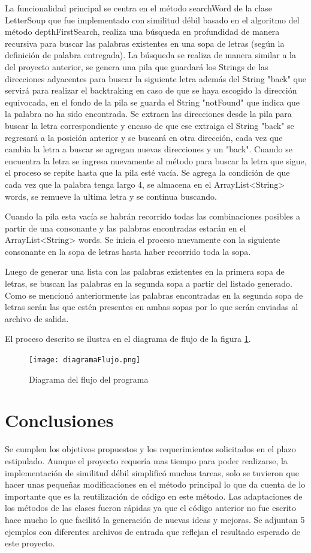 \documentclass[letterpaper,12pt]{report}
\begin{document}
La funcionalidad principal se centra en el método searchWord de la clase LetterSoup que fue implementado con similitud débil basado en el algoritmo del método depthFirstSearch, realiza una búsqueda en profundidad de manera recursiva para buscar las palabras existentes en una sopa de letras (según la definición de palabra entregada). La búsqueda se realiza de manera similar a la del proyecto anterior, se genera una pila que guardará los Strings de las direcciones adyacentes para buscar la siguiente letra además del String "back" que servirá para realizar el backtraking en caso de que se haya escogido la dirección equivocada, en el fondo de la pila se guarda el String "notFound" que indica que la palabra no ha sido encontrada. Se extraen las direcciones desde la pila para buscar la letra correspondiente y encaso de que ese extraiga el String "back" se regresará a la posición anterior y se buscará en otra dirección, cada vez que cambia la letra a buscar se agregan nuevas direcciones y un "back". Cuando se encuentra la letra se ingresa nuevamente al método para buscar la letra que sigue, el  proceso se repite hasta que la pila esté vacía. Se agrega la condición de que cada vez que la palabra tenga largo 4, se almacena en el ArrayList<String> words, se remueve la ultima letra y se continua buscando.

Cuando la pila esta vacía se habrán recorrido todas las combinaciones posibles a partir de una consonante y las palabras encontradas estarán en el ArrayList<String> words. Se inicia el proceso nuevamente con la siguiente consonante en la sopa de letras hasta haber recorrido toda la sopa.

Luego de generar una lista con las palabras existentes en la primera sopa de letras, se buscan las palabras en la segunda sopa a partir del listado generado. Como se mencionó anteriormente las palabras encontradas en la segunda sopa de letras serán las que estén presentes en ambas sopas por lo que serán enviadas al archivo de salida.

El proceso descrito se ilustra en el diagrama de flujo de la figura \ref{fig:diagramaFlujo}.

\begin{figure}[p]
    \centering
    \texttt{[image: diagramaFlujo.png]}
    \caption{Diagrama del flujo del programa}
    \label{fig:diagramaFlujo}
\end{figure}

\chapter{Conclusiones}

Se cumplen los objetivos propuestos y los requerimientos solicitados en el plazo estipulado. Aunque el proyecto requería mas tiempo para poder realizarse, la implementación de similitud débil simplificó muchas tareas, solo se tuvieron que hacer unas pequeñas modificaciones en el método principal lo que da cuenta de lo importante que es la reutilización de código en este método. Las adaptaciones de los métodos de las clases fueron rápidas ya que el código anterior no fue escrito hace mucho lo que facilitó la generación de nuevas ideas y mejoras. Se adjuntan 5 ejemplos con diferentes archivos de entrada que reflejan el resultado esperado de este proyecto.
\end{document}
